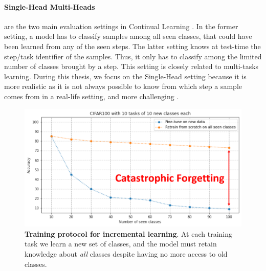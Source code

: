 \paragraph{Single-Head \vs Multi-Heads} are the two main evaluation settings in Continual Learning
\citep{chaudhry2018riemannien_walk}. In the former setting, a model has to classify samples among
all seen classes, that could have been learned from any of the seen steps. The latter setting knows
at test-time the step/task identifier of the samples. Thus, it only has to classify among the limited
number of classes brought by a step. This setting is closely related to multi-tasks learning. During
this thesis, we focus on the Single-Head setting because it is more realistic as it is not always
possible to know from which step a sample comes from in a real-life setting, and more challenging
\citep{lesort2019regulshortcomings}.

\begin{figure}[tb]
      \begin{center}
            \includegraphics[width=0.8\linewidth]{images/related/catastrophic_forgetting.pdf}
      \end{center}
      \caption{\textbf{Training protocol for incremental learning}. At each training task we learn a
            new set of classes, and the model must retain knowledge about \textit{all} classes
            despite having no more access to old classes.}
      \label{fig:related_forgetting}
\end{figure}


\label{sec:related_metrics}

